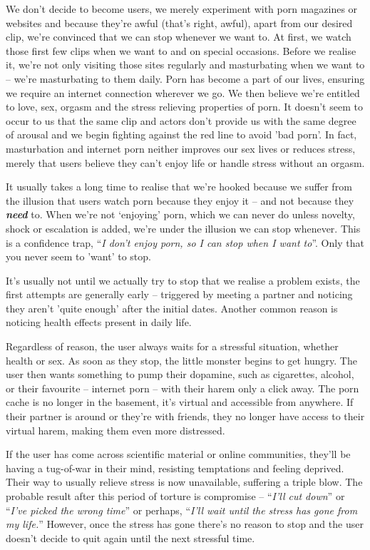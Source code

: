 \documentclass[
]{book}
\begin{document}
We don't decide to become users, we merely experiment with porn magazines or websites and because they're awful (that's right, awful), apart from our desired clip, we're convinced that we can stop whenever we want to. At first, we watch those first few clips when we want to and on special occasions. Before we realise it, we're not only visiting those sites regularly and masturbating when we want to -- we're masturbating to them daily. Porn has become a part of our lives, ensuring we require an internet connection wherever we go. We then believe we're entitled to love, sex, orgasm and the stress relieving properties of porn. It doesn't seem to occur to us that the same clip and actors don't provide us with the same degree of arousal and we begin fighting against the red line to avoid 'bad porn'. In fact, masturbation and internet porn neither improves our sex lives or reduces stress, merely that users believe they can't enjoy life or handle stress without an orgasm.

It usually takes a long time to realise that we're hooked because we suffer from the illusion that users watch porn because they enjoy it -- and not because they \textbf{\emph{need}} to. When we're not `enjoying' porn, which we can never do unless novelty, shock or escalation is added, we're under the illusion we can stop whenever. This is a confidence trap, ``\emph{I don't enjoy porn, so I can stop when I want to}''. Only that you never seem to 'want' to stop.

It's usually not until we actually try to stop that we realise a problem exists, the first attempts are generally early -- triggered by meeting a partner and noticing they aren't 'quite enough' after the initial dates. Another common reason is noticing health effects present in daily life.

Regardless of reason, the user always waits for a stressful situation, whether health or sex. As soon as they stop, the little monster begins to get hungry. The user then wants something to pump their dopamine, such as cigarettes, alcohol, or their favourite -- internet porn -- with their harem only a click away. The porn cache is no longer in the basement, it's virtual and accessible from anywhere. If their partner is around or they're with friends, they no longer have access to their virtual harem, making them even more distressed.

If the user has come across scientific material or online communities, they'll be having a tug-of-war in their mind, resisting temptations and feeling deprived. Their way to usually relieve stress is now unavailable, suffering a triple blow. The probable result after this period of torture is compromise -- ``\emph{I'll cut down}'' or ``\emph{I've picked the wrong time}'' or perhaps, ``\emph{I'll wait until the stress has gone from my life.}'' However, once the stress has gone there's no reason to stop and the user doesn't decide to quit again until the next stressful time.
\end{document}
